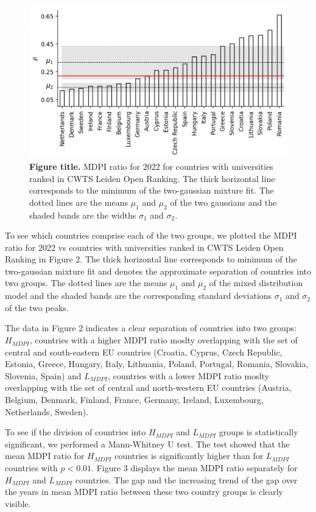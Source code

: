 \documentclass[amsfonts, amssymb, prl, superscriptaddress, notitlepage, twocolumn, nofootinbib]{revtex4-2}
\begin{document}
\begin{figure}
    \centering
    \includegraphics[width=1.0\linewidth]{Fig01af.png}
    \caption{\label{fig:fig2} {\bf Figure title.} MDPI ratio for 2022 for countries with universities ranked in CWTS Leiden Open Ranking. The thick horizontal line corresponds to the minimum of the two-gaussian mixture fit. The dotted lines are the means $\mu_1$ and $\mu_2$ of the two gaussians and the shaded bands are the widths $\sigma_1$ and $\sigma_2$.
    }
    \end{figure}

To see which countries comprise each of the two groups, we plotted the MDPI ratio for 2022 vs countries with universities ranked in CWTS Leiden Open Ranking in Figure 2. The thick horizontal line corresponds to minimum of the two-gaussian mixture fit and denotes the approximate separation of countries into two groups. The dotted lines are the means $\mu_1$ and $\mu_2$ of the mixed distribution model and the shaded bands are the corresponding standard deviations $\sigma_1$ and $\sigma_2$ of the two peaks. 

The data in Figure 2 indicates a clear separation of countries into two groups: $H_{MDPI}$, countries with a higher MDPI ratio moslty overlapping with the set of central and south-eastern EU countries (Croatia, Cyprus, Czech Republic, Estonia, Greece, Hungary, Italy, Lithuania, Poland, Portugal, Romania, Slovakia, Slovenia, Spain) and $L_{MDPI}$, countries with a lower MDPI ratio moslty overlapping with the set of central and north-western EU countries (Austria, Belgium, Denmark, Finland, France, Germany, Ireland, Luxembourg, Netherlands, Sweden). 

To see if the division of countries into $H_{MDPI}$ and $L_{MDPI}$ groups is statistically significant, we performed a Mann-Whitney U test. The test showed that the mean MDPI ratio for $H_{MDPI}$ countries is significantly higher than for $L_{MDPI}$ countries with $p<0.01$. Figure 3 displays the mean MDPI ratio separately for $H_{MDPI}$ and $L_{MDPI}$ countries. The gap and the increasing trend of the gap over the years in mean MDPI ratio between these two country groups is clearly visible. 
\end{document}
